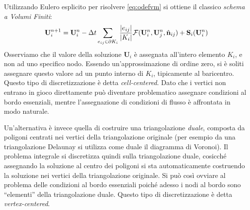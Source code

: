 Utilizzando Eulero esplicito per risolvere \eqref{eq:odefvm} si ottiene il classico \emph{schema a Volumi Finiti}:
\begin{equation} \label{eq:schemavolumifiniti}
\mathbf{U}_{i}^{n+1} = \mathbf{U}_{i}^{n} - \Delta t \sum_{e_{ij} \in \partial K_i} \frac{\left| e_{ij} \right|}{\left| K_i \right|} \mathbf{\mathcal{F}}(\mathbf U^n_i, \mathbf U^n_j, \hat{\mathbf{n}}_{ij}) + \mathbf{S}_{i}(\mathbf U^n_{i})
\end{equation}
Osserviamo che il valore della soluzione $\mathbf{U}_i$ è assegnata all'intero elemento $K_i$, e non ad uno specifico nodo. Essendo un'approssimazione di ordine zero, si è soliti assegnare questo valore ad un punto interno di $K_i$, tipicamente al baricentro. Questo tipo di discretizzazione è detta \emph{cell-centered}. Dato che i vertici non entrano in gioco direttamente può diventare problematico assegnare condizioni al bordo essenziali, mentre l'assegnazione di condizioni di flusso è affrontata in modo naturale.

Un'alternativa è invece quella di costruire una triangolazione \emph{duale}, composta da poligoni centrati nei vertici della triangolazione originale (per esempio da una triangolazione Delaunay si utilizza come duale il diagramma di Voronoi). Il problema integrale si discretizza quindi sulla triangolazione duale, cosicché assegnando la soluzione al centro dei poligoni si sta automaticamente costruendo la soluzione nei vertici della triangolazione originale. Si può così ovviare al problema delle condizioni al bordo essenziali poiché adesso i nodi al bordo sono ``elementi'' della triangolazione duale. Questo tipo di discretizzazione è detta \emph{vertex-centered}.
